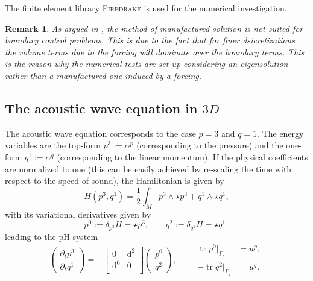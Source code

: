 \documentclass{elsarticle}
\newtheorem{remark}{Remark}
\renewcommand\d{\ensuremath{\mathrm{d}}}
\DeclareMathOperator{\tr}{tr}
\newcommand{\firedrake}{\textsc{Firedrake}\xspace}
\begin{document}
The finite element library \firedrake \cite{rathgeber2017firedrake} is used for the numerical investigation.

\begin{remark}
As argued in \cite{benner2015timebc}, the method of manufactured solution is not suited for boundary control problems. This is due to the fact that for finer dsicretizations the volume terms due to the forcing will dominate over the boundary terms. This is the reason why the numerical tests are set up considering an eigensolution rather than a manufactured one induced by a forcing.
\end{remark}

\subsection{The acoustic wave equation in $3D$}

The acoustic wave equation corresponds to the case $p=3$ and $q=1$. The energy variables are the top-form $p^3:=\alpha^p$ (corresponding to the pressure) and the one-form $q^1:=\alpha^q$ (corresponding to the linear momentum). If the physical coefficients are normalized to one (this can be easily achieved by re-scaling the time with respect to the speed of sound), the Hamiltonian is given by
\begin{equation}
    H(p^3, q^1) = \frac{1}{2} \int_M p^3 \wedge \star p^3 + q^1 \wedge \star q^1,
\end{equation}
with its variational derivatives given by
\begin{equation}
p^0:=\delta_{p^3} H = \star p^3, \qquad  q^2:= \delta_{q^1} H = \star q^1  ,  
\end{equation}
leading to the pH system
\begin{equation}\label{eq:wave_eq}
    \begin{pmatrix}
    \partial_t p^3 \\
    \partial_t q^1
    \end{pmatrix} =
    -
    \begin{bmatrix}
    0 & \d^2 \\
    \d^0 & 0 \\
    \end{bmatrix}
    \begin{pmatrix}
    p^0 \\
    q^2
    \end{pmatrix}, \qquad 
    \begin{aligned}
    \tr p^0 \vert_{\Gamma_p} &= u^p, \\
    -\tr q^2 \vert_{\Gamma_q} &= u^q.
 \end{aligned}
\end{equation}
\end{document}
